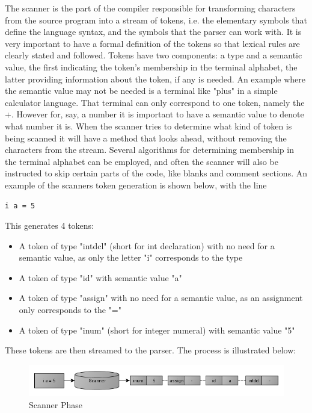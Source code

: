 The scanner is the part of the compiler responsible for transforming characters from the source program into a stream of tokens, i.e. the elementary symbols that define the language syntax, and the symbols that the parser can work with.
It is very important to have a formal definition of the tokens so that lexical rules are clearly stated and followed.
Tokens have two components: a type and a semantic value, the first indicating the token's membership in the terminal alphabet, the latter providing information about the token, if any is needed.
An example where the semantic value may not be needed is a terminal like "plus" in a simple calculator language. That terminal can only correspond to one token, namely the +. However for, say, a number it is important to have a semantic value to denote what number it is.
When the scanner tries to determine what kind of token is being scanned it will have a method that looks ahead, without removing the characters from the stream. Several algorithms for determining membership in the terminal alphabet can be employed, and often the scanner will also be instructed to skip certain parts of the code, like blanks and comment sections.
An example of the scanners token generation is shown below, with the line
\begin{lstlisting}
i a = 5
\end{lstlisting}

This generates 4 tokens: 
\begin{itemize}
\item A token of type "intdcl" (short for int declaration) with no need for a semantic value, as only the letter "i" corresponds to the type 
\item A token of type "id" with semantic value "a" 
\item A token of type "assign" with no need for a semantic value, as an assignment only corresponds to the "="
\item A token of type "inum" (short for integer numeral) with semantic value "5"
\end{itemize}

These tokens are then streamed to the parser. The process is illustrated below:
\begin{figure}[ht]
	\centering
		\includegraphics[scale = 0.5]{img/scanner.png}
	\caption{Scanner Phase}
	\label{fig:scanner}
\end{figure}


